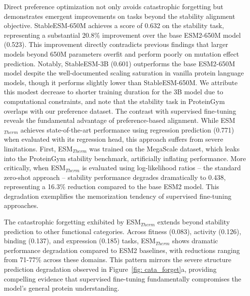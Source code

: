 \documentclass[]{fairmeta}
\begin{document}
Direct preference optimization not only avoids catastrophic forgetting but demonstrates emergent improvements on tasks beyond the stability alignment objective. StableESM-650M achieves a score of 0.632 on the stability task, representing a substantial 20.8\% improvement over the base ESM2-650M model (0.523). This improvement directly contradicts previous findings that larger models beyond 650M parameters overfit and perform poorly on mutation effect prediction. Notably, StableESM-3B (0.601) outperforms the base ESM2-650M model despite the well-documented scaling saturation in vanilla protein language models, though it performs slightly lower than StableESM-650M. We attribute this modest decrease to shorter training duration for the 3B model due to computational constraints, and note that the stability task in ProteinGym overlaps with our preference dataset.
The contrast with supervised fine-tuning reveals the fundamental advantage of preference-based alignment. While ESM$_{Therm}$ achieves state-of-the-art performance using regression prediction (0.771) when evaluated with its regression head, this approach suffers from severe limitations. First, ESM$_{Therm}$ was trained on the MegaScale dataset, which leaks into the ProteinGym stability benchmark, artificially inflating performance. More critically, when ESM$_{Therm}$ is evaluated using log-likelihood ratios -- the standard zero-shot approach -- stability performance degrades dramatically to 0.438, representing a 16.3\% reduction compared to the base ESM2 model. This degradation exemplifies the memorization tendency of supervised fine-tuning approaches.

The catastrophic forgetting exhibited by ESM$_{Therm}$ extends beyond stability prediction to other functional categories. Across fitness (0.083), activity (0.126), binding (0.137), and expression (0.185) tasks, ESM$_{Therm}$ shows dramatic performance degradation compared to ESM2 baselines, with reductions ranging from 71-77\% across these domains. This pattern mirrors the severe structure prediction degradation observed in Figure~\ref{fig: cata_forget}a, providing compelling evidence that supervised fine-tuning fundamentally compromises the model's general protein understanding.
\end{document}
